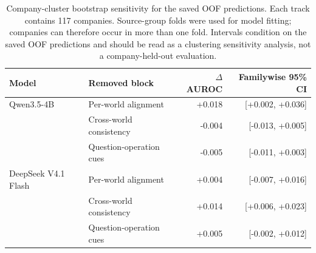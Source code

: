 \begin{table}[t]
\centering
\small
\begin{tabular}{llrr}
\toprule
Model & Removed block & $\Delta$ AUROC & Familywise 95\% CI \\
\midrule
Qwen3.5-4B & Per-world alignment & +0.018 & [+0.002, +0.036] \\
 & Cross-world consistency & -0.004 & [-0.013, +0.005] \\
 & Question-operation cues & -0.005 & [-0.011, +0.003] \\
\addlinespace
DeepSeek V4.1 Flash & Per-world alignment & +0.004 & [-0.007, +0.016] \\
 & Cross-world consistency & +0.014 & [+0.006, +0.023] \\
 & Question-operation cues & +0.005 & [-0.002, +0.012] \\
\bottomrule
\end{tabular}
\caption{Company-cluster bootstrap sensitivity for the saved OOF predictions. Each track contains 117 companies. Source-group folds were used for model fitting; companies can therefore occur in more than one fold. Intervals condition on the saved OOF predictions and should be read as a clustering sensitivity analysis, not a company-held-out evaluation.}
\label{tab:raw44-component-ablation-company}
\end{table}
